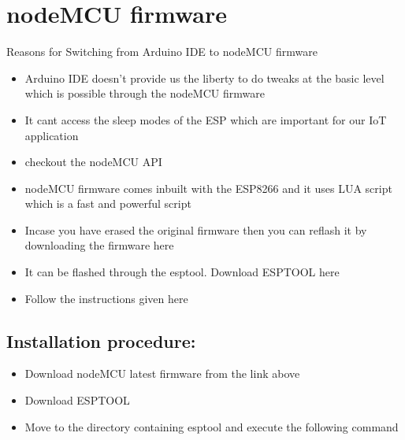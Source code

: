 \documentclass[16pt]{article}
\begin{document}
\vspace{19cm}
\section{nodeMCU firmware}
\vspace{0.5cm}

Reasons for Switching from Arduino IDE to nodeMCU firmware

\begin{itemize}

\item
  Arduino IDE doesn't provide us the liberty to do tweaks at the basic
  level which is possible through the nodeMCU firmware
\item
  It cant access the sleep modes of the ESP which are important for our
  IoT application
\item
  checkout the nodeMCU API
\item
  nodeMCU firmware comes inbuilt with the ESP8266 and it uses LUA script
  which is a fast and powerful script
\item
  Incase you have erased the original firmware then you can reflash it
  by downloading the firmware here
\item
  It can be flashed through the esptool. Download ESPTOOL here
\item
  Follow the instructions given here
 
\end{itemize}

\subsection{Installation procedure:}

\begin{itemize}

\item
  Download nodeMCU latest firmware from the link above
\item
  Download ESPTOOL
\item
  Move to the directory containing esptool and execute the following
  command
\end{itemize}
\end{document}

